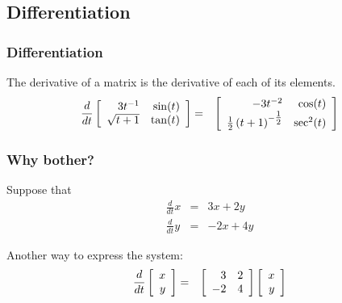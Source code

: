 \subsection{Differentiation}

\begin{frame}
  \frametitle{Differentiation}

  The derivative of a matrix is the derivative of each of its elements.
  \begin{eqnarray*}
    \frac{d}{dt} \left[ \begin{array}{rr} 3t^{-1} & \sin(t) \\ \sqrt{t+1} & \tan(t) \end{array} \right] & = & 
    \left[ \begin{array}{rr} -3t^{-2} & \cos(t) \\ \mbox{$\frac{1}{2}$}\left( t+1\right)^{-\mbox{$\frac{1}{2}$}} & \sec^2(t) \end{array} \right]
  \end{eqnarray*}

\end{frame}

\begin{frame}
  \frametitle{Why bother?}

  Suppose that
  \begin{eqnarray*}
    \frac{d}{dt} x & = & 3x + 2y \\
    \frac{d}{dt} y & = & -2 x + 4 y
  \end{eqnarray*}

  Another way to express the system:
  \begin{eqnarray*}
    \frac{d}{dt} \left[ \begin{array}{r} x \\ y \end{array} \right] & = & \left[ \begin{array}{rr} 3 & 2 \\ -2 & 4 \end{array} \right] \left[ \begin{array}{r} x \\ y \end{array} \right]
  \end{eqnarray*}

\end{frame}



